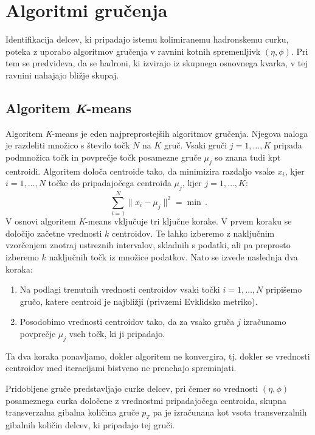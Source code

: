 \documentclass[slovene,11pt,a4paper]{article}
\begin{document}
\section*{Algoritmi gručenja}
\label{sec:algos}
Identifikacija delcev, ki pripadajo istemu kolimiranemu hadronskemu curku, poteka z uporabo algoritmov gručenja v ravnini kotnih spremenljivk $(\eta, \phi)$. Pri tem se predvideva, da se hadroni, ki izvirajo iz skupnega osnovnega kvarka, v tej ravnini nahajajo bližje skupaj.

\subsection*{Algoritem \textit{K}-means}
Algoritem \textit{K}-means je eden najpreprostejših algoritmov gručenja.
Njegova naloga je razdeliti množico s število točk $N$ na $K$ gruč. Vsaki gruči $j=1,\dots,K$ pripada podmnožica točk in povprečje točk posamezne gruče $\mu_j$ so znana tudi kpt centroidi. Algoritem določa centroide tako, da minimizira razdaljo vsake $x_i$, kjer $i=1,\dots,N$ točke do pripadajočega centroida $\mu_j$, kjer $j=1,\dots,K$:  
\begin{equation}  
	\sum_{i=1}^{N} \|x_i-\mu_j\|^2 = \min\,.
\end{equation}  
V osnovi algoritem \textit{K}-means vključuje tri ključne korake. V prvem koraku se določijo začetne vrednosti $k$ centroidov. Te lahko izberemo z naključnim vzorčenjem znotraj ustreznih intervalov, skladnih s podatki, ali pa preprosto izberemo $k$ naključnih točk iz množice podatkov. Nato se izvede naslednja dva koraka:  
\begin{enumerate}  
	\item Na podlagi trenutnih vrednosti centroidov vsaki točki $i=1,\dots,N$ pripišemo gručo, katere centroid je najbližji (privzemi Evklidsko metriko).  
	\item Posodobimo vrednosti centroidov tako, da za vsako gruča $j$ izračunamo povprečje $\mu_j$ vseh točk, ki ji pripadajo.  
\end{enumerate}  
Ta dva koraka ponavljamo, dokler algoritem ne konvergira, tj. dokler se vrednosti centroidov med iteracijami bistveno ne prenehajo spreminjati.  

Pridobljene gruče predstavljajo curke delcev, pri čemer so vrednosti $(\eta, \phi)$ posameznega curka določene z vrednostmi pripadajočega centroida, skupna transverzalna gibalna količina gruče $p_T$ pa je izračunana kot vsota transverzalnih gibalnih količin delcev, ki pripadajo tej gruči.
\end{document}
